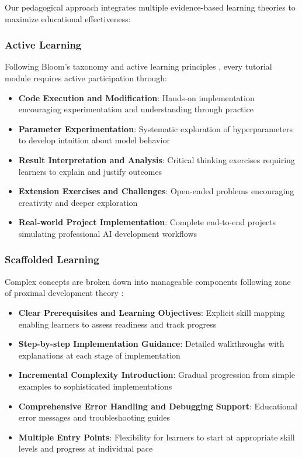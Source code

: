 Our pedagogical approach integrates multiple evidence-based learning theories to maximize educational effectiveness:

\subsubsection{Active Learning}

Following Bloom's taxonomy \cite{bloom1956taxonomy} and active learning principles \cite{freeman2014active}, every tutorial module requires active participation through:
\begin{itemize}
    \item \textbf{Code Execution and Modification}: Hands-on implementation encouraging experimentation and understanding through practice
    \item \textbf{Parameter Experimentation}: Systematic exploration of hyperparameters to develop intuition about model behavior
    \item \textbf{Result Interpretation and Analysis}: Critical thinking exercises requiring learners to explain and justify outcomes
    \item \textbf{Extension Exercises and Challenges}: Open-ended problems encouraging creativity and deeper exploration
    \item \textbf{Real-world Project Implementation}: Complete end-to-end projects simulating professional AI development workflows
\end{itemize}

\subsubsection{Scaffolded Learning}

Complex concepts are broken down into manageable components following zone of proximal development theory \cite{vygotsky1978mind}:
\begin{itemize}
    \item \textbf{Clear Prerequisites and Learning Objectives}: Explicit skill mapping enabling learners to assess readiness and track progress
    \item \textbf{Step-by-step Implementation Guidance}: Detailed walkthroughs with explanations at each stage of implementation
    \item \textbf{Incremental Complexity Introduction}: Gradual progression from simple examples to sophisticated implementations
    \item \textbf{Comprehensive Error Handling and Debugging Support}: Educational error messages and troubleshooting guides
    \item \textbf{Multiple Entry Points}: Flexibility for learners to start at appropriate skill levels and progress at individual pace
\end{itemize}

